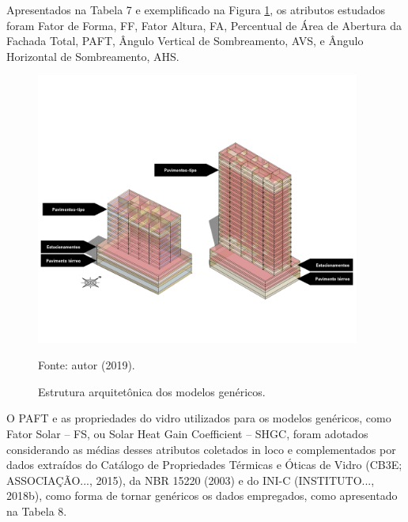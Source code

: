 \noindent Apresentados na Tabela 7 e exemplificado na Figura \ref{fig:figura11}, os atributos estudados foram Fator de 
Forma, FF, Fator Altura, FA, Percentual de Área de Abertura da Fachada Total, PAFT, Ângulo 
Vertical de Sombreamento, AVS, e Ângulo Horizontal de Sombreamento, AHS.
    \begin{figure}[ht]
        \centering
        \caption{\small Estrutura arquitetônica dos modelos genéricos.}
        \includegraphics[width=0.95\textwidth]{figures/fig11_8-19-2pav.png}
        \begin{flushleft}
            \par \small Fonte: autor (2019).
        \end{flushleft}
        \label{fig:figura11}
    \end{figure}

O PAFT e as propriedades do vidro utilizados para os modelos genéricos, como Fator Solar – FS, 
ou Solar Heat Gain Coefficient – SHGC, foram adotados considerando as médias desses atributos 
coletados in loco e complementados por dados extraídos do Catálogo de Propriedades Térmicas e 
Óticas de Vidro (CB3E; ASSOCIAÇÃO..., 2015), da NBR 15220 (2003) e do INI-C (INSTITUTO..., 2018b), 
como forma de tornar genéricos os dados empregados, como apresentado na Tabela 8.
